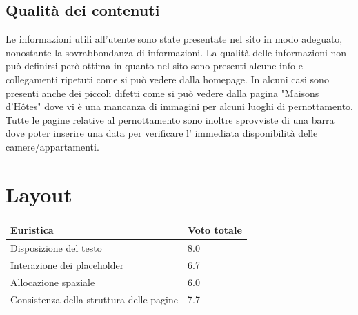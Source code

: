         \subsection{Qualità dei contenuti}
        Le informazioni utili all'utente sono state presentate nel sito in modo
        adeguato, nonostante la sovrabbondanza di informazioni. La qualità delle
        informazioni non può definirsi però ottima in quanto nel sito sono
        presenti alcune info e collegamenti ripetuti come si può vedere dalla
        homepage. In alcuni casi sono presenti anche dei piccoli difetti come si
        può vedere dalla pagina "Maisons d’Hôtes" dove vi è una mancanza di
        immagini per alcuni luoghi di pernottamento. Tutte le pagine relative al
        pernottamento sono inoltre sprovviste di una barra dove poter inserire
        una data per verificare l' immediata disponibilità delle
        camere/appartamenti.
    \section{Layout}
    \begin{table}[H]
        \begin{tabular}{|l|l|}
        \hline \textbf{Euristica} & \textbf{Voto totale} \\ \hline
        Disposizione del testo                      & 8.0 \\ \hline
        Interazione dei placeholder                 & 6.7 \\ \hline
        Allocazione spaziale                        & 6.0 \\ \hline
        Consistenza della struttura delle pagine    & 7.7 \\ \hline
        \end{tabular}
        \end{table}
